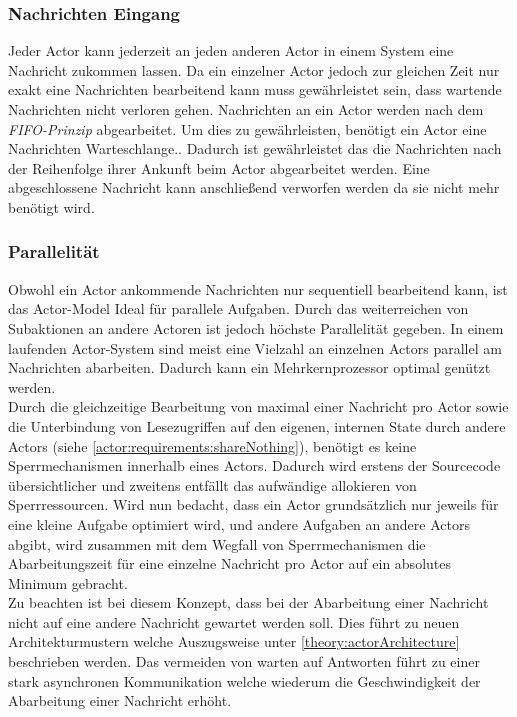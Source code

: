 \subsubsection{Nachrichten Eingang}\label{actor:Mailbox}
Jeder Actor kann jederzeit an jeden anderen Actor in einem System eine Nachricht zukommen lassen. Da ein einzelner Actor jedoch zur gleichen Zeit nur exakt eine Nachrichten bearbeitend kann muss gewährleistet sein, dass wartende Nachrichten nicht verloren gehen. Nachrichten an ein Actor werden nach dem \textit{FIFO-Prinzip} abgearbeitet. 
 Um dies zu gewährleisten, benötigt ein Actor eine Nachrichten Warteschlange.\citep{Agha1985ActorsSystems}.  Dadurch ist gewährleistet das die Nachrichten nach der Reihenfolge ihrer Ankunft beim Actor abgearbeitet werden. Eine abgeschlossene Nachricht kann anschließend verworfen werden da sie nicht mehr benötigt wird. 

\subsubsection{Parallelität}\label{actor:parallelism}
Obwohl ein Actor ankommende Nachrichten nur sequentiell bearbeitend kann, ist das Actor-Model Ideal für parallele Aufgaben.\citep{hewitt1973session} Durch das weiterreichen von Subaktionen an andere Actoren ist jedoch höchste Parallelität gegeben. In einem laufenden Actor-System sind meist eine Vielzahl an einzelnen Actors parallel am Nachrichten abarbeiten. Dadurch kann ein Mehrkernprozessor optimal genützt werden. \citep{Agha1985ActorsSystems} \\
Durch die gleichzeitige Bearbeitung von maximal einer Nachricht pro Actor sowie die Unterbindung von Lesezugriffen auf den eigenen, internen State durch andere Actors (siehe \ref{actor:requirements:shareNothing}), benötigt es keine Sperrmechanismen innerhalb eines Actors. Dadurch wird erstens der Sourcecode übersichtlicher und zweitens entfällt das aufwändige allokieren von Sperrressourcen.\citep{Vernon2015ReactiveAkka}
Wird nun bedacht, dass ein Actor grundsätzlich nur jeweils für eine kleine Aufgabe optimiert wird, und andere Aufgaben an andere Actors abgibt, wird zusammen mit dem Wegfall von Sperrmechanismen die Abarbeitungszeit für eine einzelne Nachricht pro Actor auf ein absolutes Minimum gebracht. \citep{Vernon2015ReactiveAkka} \\
Zu beachten ist bei diesem Konzept, dass bei der Abarbeitung einer Nachricht nicht auf eine andere Nachricht gewartet werden soll. Dies führt zu neuen Architekturmustern welche Auszugsweise unter \ref{theory:actorArchitecture} beschrieben werden. Das vermeiden von warten auf Antworten führt zu einer stark asynchronen Kommunikation welche wiederum die Geschwindigkeit der Abarbeitung einer Nachricht erhöht.

